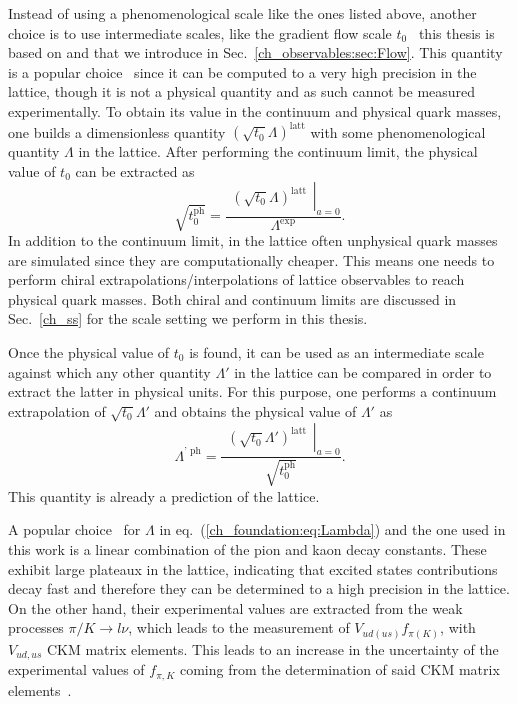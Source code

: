 Instead of using a phenomenological scale like the ones listed above, another choice is to use intermediate scales, like the gradient flow scale $t_0$~\citep{Luscher:2010we,1006.4518} this thesis is based on and that we introduce in Sec.~\ref{ch_observables:sec:Flow}. This quantity is a popular choice~\citep{Bruno:2016plf,Strassberger:2023xnj,RQCD_scale,Kostrzewa:2021syw,Hollwieser:2020qri,MILC:2015tqx} since it can be computed to a very high precision in the lattice, though it is not a physical quantity and as such cannot be measured experimentally. To obtain its value in the continuum and physical quark masses, one builds a dimensionless quantity $(\sqrt{t_0}\Lambda)^{\textrm{latt}}$ with some phenomenological quantity $\Lambda$ in the lattice. After performing the continuum limit, the physical value of $t_0$ can be extracted as
\begin{equation}
\label{ch_foundation:eq:Lambda}
\sqrt{t_0^{\textrm{ph}}}=\frac{\left.\begin{matrix}
\left(\sqrt{t_0}\Lambda\right)^{\textrm{latt}}
\end{matrix}\right|_{a=0}}{\Lambda^{\textrm{exp}}}.
\end{equation}
In addition to the continuum limit, in the lattice often unphysical quark masses are simulated since they are computationally cheaper. This means one needs to perform chiral extrapolations/interpolations of lattice observables to reach physical quark masses. Both chiral and continuum limits are discussed in Sec.~\ref{ch_ss} for the scale setting we perform in this thesis.

Once the physical value of $t_0$ is found, it can be used as an intermediate scale against which any other quantity $\Lambda'$ in the lattice can be compared in order to extract the latter in physical units. For this purpose, one performs a continuum extrapolation of $\sqrt{t_0}\Lambda'$ and obtains the physical value of $\Lambda'$ as
\begin{equation}
\Lambda^{\textrm{' ph}}=\frac{\left.\begin{matrix}
\left(\sqrt{t_0}\Lambda'\right)^{\textrm{latt}}
\end{matrix}\right|_{a=0}}{\sqrt{t_0^{\textrm{ph}}}}.
\end{equation}
This quantity is already a prediction of the lattice.

A popular choice~\citep{Brown:2018jtv,BMW:2012hcm,BMW:2012hcm,Bruno:2016plf,Strassberger:2023xnj} for $\Lambda$ in eq.~(\ref{ch_foundation:eq:Lambda}) and the one used in this work is a linear combination of the pion and kaon decay constants. These exhibit large plateaux in the lattice, indicating that excited states contributions decay fast and therefore they can be determined to a high precision in the lattice. On the other hand, their experimental values are extracted from the weak processes $\pi/K\to l\nu$, which leads to the measurement of $V_{ud(us)}f_{\pi(K)}$, with $V_{ud,us}$ CKM matrix elements. This leads to an increase in the uncertainty of the experimental values of $f_{\pi,K}$ coming from the determination of said CKM matrix elements~\citep{FlavourLatticeAveragingGroupFLAG:2021npn}.

